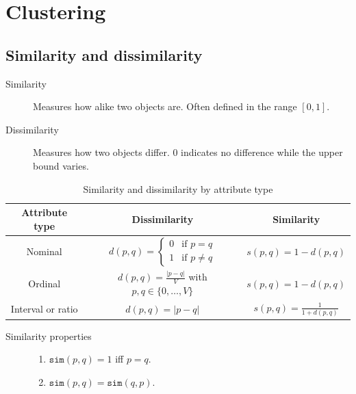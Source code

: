 \chapter{Clustering}


\section{Similarity and dissimilarity}

\begin{description}
    \item[Similarity] 
        Measures how alike two objects are.
        Often defined in the range $[0, 1]$.

    \item[Dissimilarity] 
        Measures how two objects differ.
        0 indicates no difference while the upper bound varies.
\end{description}

\begin{table}[ht]
    \centering
    \renewcommand{\arraystretch}{2}
    \begin{tabular}{c | c | c}
        \textbf{Attribute type} & \textbf{Dissimilarity} & \textbf{Similarity} \\
        \hline
        Nominal & $d(p, q) = \begin{cases} 0 & \text{if } p=q \\ 1 & \text{if } p \neq q \end{cases}$ & $s(p, q) = 1 - d(p, q)$ \\
        \hline
        Ordinal & $d(p, q) = \frac{\vert p - q \vert}{V}$ with $p, q \in \{ 0, \dots, V \}$ & $s(p, q) = 1 - d(p, q)$ \\
        \hline
        Interval or ratio & $d(p, q) = \vert p - q \vert$ & $s(p, q) = \frac{1}{1 + d(p, q)}$
    \end{tabular}
    \caption{Similarity and dissimilarity by attribute type}
\end{table}

\begin{description}
    \item[Similarity properties] \phantom{}
        \begin{enumerate}
            \item $\texttt{sim}(p, q) = 1$ iff $p = q$. 
            \item $\texttt{sim}(p, q) = \texttt{sim}(q, p)$. 
        \end{enumerate}
\end{description}


